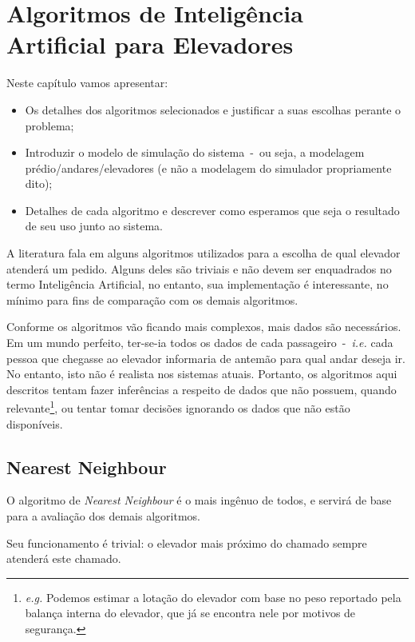 \chapter{\label{chap:ai}Algoritmos de Inteligência Artificial para Elevadores}

Neste capítulo vamos apresentar:

\begin{itemize}
\item Os detalhes dos algoritmos selecionados e justificar a suas escolhas perante o problema;
\item Introduzir o modelo de simulação do sistema~-~ou seja, a modelagem
prédio/andares/elevadores (e não a modelagem do simulador propriamente dito);
\item Detalhes de cada algoritmo e descrever como esperamos que seja o resultado de seu uso junto ao sistema.
\end{itemize}

A literatura fala em alguns algoritmos utilizados para a escolha de qual
elevador atenderá um pedido. Alguns deles são triviais e não devem ser
enquadrados no termo Inteligência Artificial, no entanto, sua implementação é
interessante, no mínimo para fins de comparação com os demais algoritmos.

Conforme os algoritmos vão ficando mais complexos, mais dados são necessários.
Em um mundo perfeito, ter-se-ia todos os dados de cada passageiro~-~\textit{i.e.} cada
pessoa que chegasse ao elevador informaria de antemão para qual andar deseja ir.
No entanto, isto não é realista nos sistemas atuais. Portanto, os algoritmos
aqui descritos tentam fazer inferências a respeito de dados que não possuem,
quando relevante\footnote{\textit{e.g.} Podemos estimar a lotação do elevador
  com base no peso reportado pela balança interna do elevador, que já se
  encontra nele por motivos de segurança.}, ou tentar tomar decisões ignorando
os dados que não estão disponíveis.

\section{\label{sec:ai:nn}Nearest Neighbour}

O algoritmo de \textit{Nearest Neighbour} é o mais ingênuo de todos, e servirá
de base para a avaliação dos demais algoritmos.

Seu funcionamento é trivial: o elevador mais próximo do chamado sempre
atenderá este chamado.

